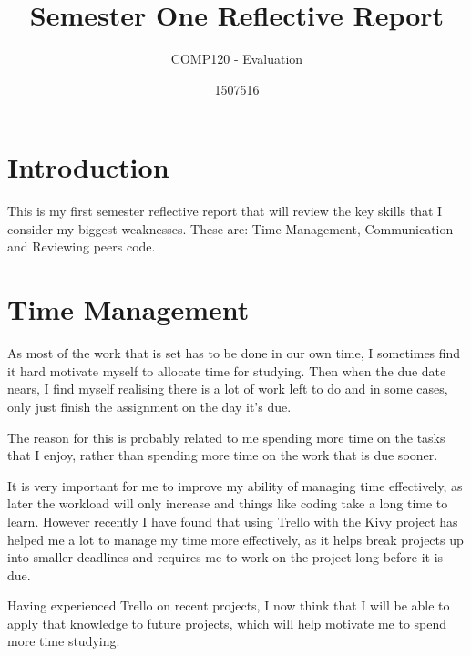 \documentclass{scrartcl}
\title{Semester One Reflective Report}
\subtitle{COMP120 - Evaluation}
\author{1507516}
\begin{document}
\maketitle

\section{Introduction}
This is my first semester reflective report that will review the key skills that I consider my biggest weaknesses. These are: Time Management, Communication and Reviewing peers code.

\section{Time Management}

As most of the work that is set has to be done in our own time, I sometimes find it hard motivate myself to allocate time for studying. Then when the due date nears, I find myself realising there is a lot of work left to do and in some cases, only just finish the assignment on the day it's due.

The reason for this is probably related to me spending more time on the tasks that I enjoy, rather than spending more time on the work that is due sooner. 

It is very important for me to improve my ability of managing time effectively, as later the workload will only increase and things like coding take a long time to learn. However recently I have found that using Trello with the Kivy project has helped me a lot to manage my time more effectively, as it helps break projects up into smaller deadlines and requires me to work on the project long before it is due.

Having experienced Trello on recent projects, I now think that I will be able to apply that knowledge to future projects, which will help motivate me to spend more time studying. 
\end{document}
